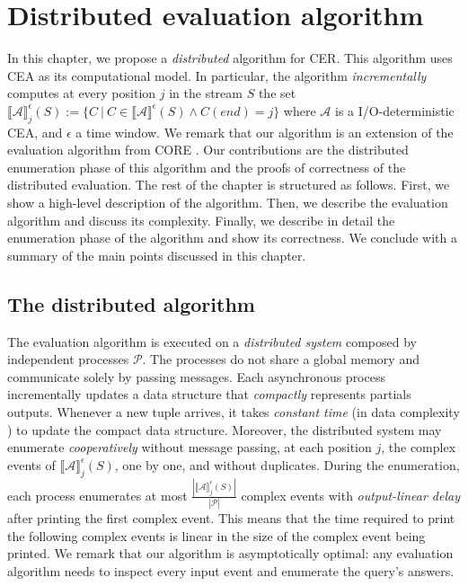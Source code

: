 \chapter{Distributed evaluation algorithm}\label{chapter:algorithm}

In this chapter, we propose a \emph{distributed} algorithm for CER. This algorithm uses CEA as its computational model. In particular, the algorithm \emph{incrementally} computes at every position $j$ in the stream $S$ the set ${\llbracket \mathcal{A} \rrbracket}^{\epsilon}_{j}(S) := \{ C \ | \ C \in {\llbracket \mathcal{A} \rrbracket}^{\epsilon}(S) \land C(end) = j \}$ where $\mathcal{A}$ is a I/O-deterministic CEA, and $\epsilon$ a time window. We remark that our algorithm is an extension of the evaluation algorithm from CORE \cite{core}. Our contributions are the distributed enumeration phase of this algorithm and the proofs of correctness of the distributed evaluation. The rest of the chapter is structured as follows. First, we show a high-level description of the algorithm. Then, we describe the evaluation algorithm and discuss its complexity. Finally, we describe in detail the enumeration phase of the algorithm and show its correctness. We conclude with a summary of the main points discussed in this chapter.

\section{The distributed algorithm}\label{sec:distributed}

The evaluation algorithm is executed on a \emph{distributed system} composed by independent processes $\mathcal{P}$. The processes do not share a global memory and communicate solely by passing messages. Each asynchronous process incrementally updates a data structure that \emph{compactly} represents partials outputs. Whenever a new tuple arrives, it takes \emph{constant time} (in data complexity \cite{data-complexity}) to update the compact data structure. Moreover, the distributed system may enumerate \emph{cooperatively} without message passing, at each position $j$, the complex events of ${\llbracket \mathcal{A} \rrbracket}^{\epsilon}_{j}(S)$, one by one, and without duplicates. During the enumeration, each process enumerates at most $\frac{|{\llbracket \mathcal{A} \rrbracket}^{\epsilon}_{j}(S)|}{|\mathcal{P}|}$ complex events with \emph{output-linear delay} after printing the first complex event. This means that the time required to print the following complex events is linear in the size of the complex event being printed. We remark that our algorithm is asymptotically optimal: any evaluation algorithm needs to inspect every input event and enumerate the query's answers.

